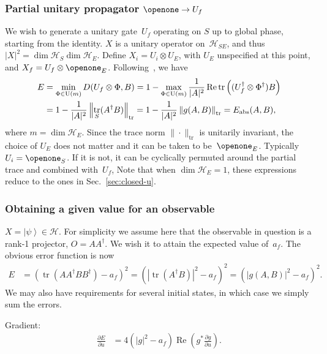 \documentclass[aps, pra, a4paper, longbibliography, superscriptaddress]{revtex4-1}
\newcommand{\I}{\openone}
\newcommand{\ket}[1]{\left| #1 \right \rangle}
\newcommand{\hilb}[1]{\mathcal{#1}}
\DeclareMathOperator{\tr}{tr}
\DeclareMathOperator{\re}{Re}
\newcommand{\dd}[2]{\frac{\partial #1}{\partial #2}}
\begin{document}
\subsubsection{Partial unitary propagator $\I \to U_f$}

We wish to generate a unitary gate~$U_f$ operating on $S$ up to global
phase, starting from the identity.
$X$ is a unitary operator on~$\hilb{H}_{SE}$, and
thus $|X|^2 = \dim \hilb{H}_S \dim \hilb{H}_E$.
Define $X_i = U_i \otimes U_E$, with $U_E$ unspecified at this point,
and $X_f = U_f \otimes \I_E$.
Following~\cite{kosut_2006,floether_2012}, we have
\begin{align}
\notag
E
&= \min_{\Phi \in \text{U}(m)} D(U_f \otimes \Phi, B)
= 1 -\max_{\Phi \in \text{U}(m)} \frac{1}{|A|^2} \re \tr\left((U_f^\dagger \otimes \Phi^\dagger) B\right)\\
&= 1 -\frac{1}{|A|^2} \left\|\tr_S(A^\dagger B)\right\|_{\tr}
= 1 -\frac{1}{|A|^2} \left\|g(A, B)\right\|_{\tr}
= E_\text{abs}(A, B),
\end{align}
where $m = \dim \hilb{H}_E$.
Since the trace norm $\|\cdot\|_{\tr}$ is unitarily invariant, the
choice of $U_E$ does not matter and it can be taken to be~$\I_E$.
Typically $U_i = \I_S$. If it is not, it can be cyclically permuted around the partial trace and combined with~$U_f$,
Note that when $\dim \hilb{H}_E = 1$, these expressions reduce to the ones in Sec.~\ref{sec:closed-u}.


\subsubsection{Obtaining a given value for an observable}

$X = \ket{\psi} \in \hilb{H}$.
For simplicity we assume here that the observable in question is a rank-1 projector,
$O = A A^\dagger$. We wish it to attain the expected value of~$a_{f}$. The obvious error function is now
\begin{align}
E
&=
\left(\tr\left(A A^\dagger B B^\dagger \right) -a_{f} \right)^2
= \left(\left|\tr(A^\dagger B)\right|^2 -a_{f} \right)^2
= \left(\left|g(A, B)\right|^2 -a_{f} \right)^2.
\end{align}
We may also have requirements for several initial states, in which case we simply sum the errors.

Gradient:
\begin{align}
\dd{E}{u}
&=
4 \left(\left|g\right|^2 -a_{f} \right) \re \left(g^* \dd{g}{u}\right).
\end{align}
\end{document}
